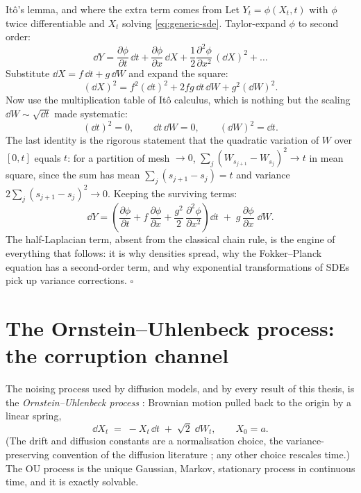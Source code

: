 \begin{toolbox}{It\^o's lemma, and where the extra term comes from}
Let $Y_t = \phi(X_t, t)$ with $\phi$ twice differentiable and $X_t$
solving \eqref{eq:generic-sde}. Taylor-expand $\phi$ to second order:
\begin{equation*}
  \dd Y
  = \frac{\partial \phi}{\partial t}\,\dd t
  + \frac{\partial \phi}{\partial x}\,\dd X
  + \frac{1}{2} \frac{\partial^2 \phi}{\partial x^2}\,(\dd X)^2
  + \dots
\end{equation*}
Substitute $\dd X = f\,\dd t + g\,\dd W$ and expand the square:
\begin{equation*}
  (\dd X)^2 = f^2 (\dd t)^2 + 2 f g\, \dd t\, \dd W + g^2 (\dd W)^2 .
\end{equation*}
Now use the multiplication table of It\^o calculus, which is nothing but
the scaling $\dd W \sim \sqrt{\dd t}$ made systematic:
\begin{equation*}
  (\dd t)^2 = 0, \qquad \dd t\, \dd W = 0, \qquad (\dd W)^2 = \dd t .
\end{equation*}
The last identity is the rigorous statement that the quadratic variation
of $W$ over $[0,t]$ equals $t$: for a partition of mesh $\to 0$,
$\sum_j (W_{s_{j+1}} - W_{s_j})^2 \to t$ in mean square, since the sum
has mean $\sum_j (s_{j+1} - s_j) = t$ and variance
$2\sum_j (s_{j+1}-s_j)^2 \to 0$. Keeping the surviving terms:
\begin{equation*}
  \dd Y = \left(
    \frac{\partial \phi}{\partial t}
    + f\,\frac{\partial \phi}{\partial x}
    + \frac{g^2}{2}\,\frac{\partial^2 \phi}{\partial x^2}
  \right) \dd t
  \;+\; g\,\frac{\partial \phi}{\partial x}\; \dd W .
\end{equation*}
The half-Laplacian term, absent from the classical chain rule, is the
engine of everything that follows: it is why densities spread, why the
Fokker--Planck equation has a second-order term, and why exponential
transformations of SDEs pick up variance corrections. \hfill$\square$
\end{toolbox}

\section{The Ornstein--Uhlenbeck process: the corruption channel}
\label{sec:ou}

The noising process used by diffusion models, and by every result of this
thesis, is the \emph{Ornstein--Uhlenbeck process}
\citep{uhlenbeck1930theory}: Brownian motion pulled back to the origin by
a linear spring,
\begin{equation}
  \dd X_t \;=\; -X_t\,\dd t \;+\; \sqrt{2}\;\dd W_t ,
  \qquad X_0 = a .
  \label{eq:ou-sde}
\end{equation}
(The drift and diffusion constants are a normalisation choice, the
variance-preserving convention of the diffusion literature
\citep{song2021scorebased}; any other choice rescales time.) The OU
process is the unique Gaussian, Markov, stationary process in continuous
time, and it is exactly solvable.


